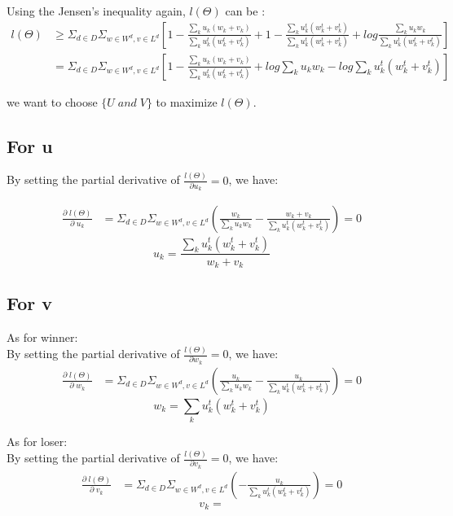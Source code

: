 \documentclass{article}
\begin{document}
Using the Jensen's inequality again, $l(\Theta)$ can be :
\begin{align}
l(\Theta)
& \geq \Sigma_{d \in D} \Sigma_{w\in W^d, v\in L^d} [1- \frac{\sum_k u_k(w_k+v_k)}{\sum_k u_k^t(w_k^t +v_k^t)}+ 1-\frac{\sum_k u_k^t(w_k^t +v_k^t)}{\sum_k u_k^t(w_k^t +v_k^t)} +log \frac{\sum_k u_k w_k}{\sum_k u_k^t (w_k^t+v_k^t)}]\\
& =\Sigma_{d \in D} \Sigma_{w\in W^d, v\in L^d} [1- \frac{\sum_k u_k(w_k+v_k)}{\sum_k u_k^t(w_k^t +v_k^t)}+ log \sum_k u_k w_k -log \sum_k u_k^t (w_k^t+v_k^t)]
\end{align}

 we want to choose $\{ U \; and \; V\}$ to maximize $ l(\Theta). $ 


\subsection{For u}
By setting the partial derivative of $\frac{l(\Theta)}{\partial u_k}=0$, we have:

\begin{align}
\frac{\partial \;l(\Theta) }{\partial \;u_k}
 &= \Sigma_{d \in D} \Sigma_{w\in W^d, v\in L^d}(\frac{w_k}{\sum_k u_k w_k}-\frac{w_k+v_k}{\sum_k u_k^t(w_k^t +v_k^t)}) =0
\end{align}
$$ u_k = \frac{\sum_k u_k^t(w_k^t +v_k^t)}{w_k+v_k}$$
 
\subsection{For v}

As for winner:\\
By setting the partial derivative of $\frac{l(\Theta)}{\partial w_k}=0$, we have:
\begin{align}
\frac{\partial \;l(\Theta)}{\partial \;w_k}
&=  \Sigma_{d \in D} \Sigma_{w\in W^d, v\in L^d}(\frac{u_k}{\sum_k u_k w_k}-\frac{u_k}{\sum_k u_k^t(w_k^t +v_k^t)})=0
\end{align}
$$ w_k = \sum_k u_k^t(w_k^t +v_k^t) $$

As for loser:\\
By setting the partial derivative of $\frac{l(\Theta)}{\partial v_k}=0$, we have:
\begin{align}
\frac{\partial \;l(\Theta)}{\partial \;v_k}
&=  \Sigma_{d \in D} \Sigma_{w\in W^d, v\in L^d}(-\frac{u_k}{\sum_k u_k^t(w_k^t +v_k^t)})=0
\end{align}
$$ v_k =  $$
\end{document}
